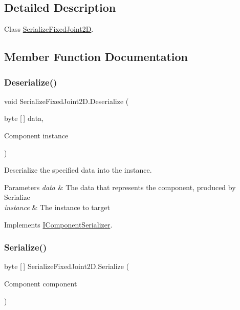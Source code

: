 \subsection{Detailed Description}
Class \hyperlink{class_serialize_fixed_joint2_d}{Serialize\+Fixed\+Joint2D}. 



\subsection{Member Function Documentation}
\mbox{\label{class_serialize_fixed_joint2_d_aa2cc872282e6bb7c209ac406fb0b8335}} 
\subsubsection{\texorpdfstring{Deserialize()}{Deserialize()}}
{\footnotesize\ttfamily void Serialize\+Fixed\+Joint2\+D.\+Deserialize (\begin{DoxyParamCaption}\item[{byte \mbox{[}$\,$\mbox{]}}]{data,  }\item[{Component}]{instance }\end{DoxyParamCaption})\hspace{0.3cm}{\ttfamily [inline]}}



Deserialize the specified data into the instance. 


\begin{DoxyParams}{Parameters}
{\em data} & The data that represents the component, produced by Serialize\\
\hline
{\em instance} & The instance to target\\
\hline
\end{DoxyParams}


Implements \hyperlink{interface_i_component_serializer_a4cc366a5c78b33d47a90c209d8fed883}{I\+Component\+Serializer}.

\mbox{\label{class_serialize_fixed_joint2_d_a9eb05bc525fe5cbf55dd5e917e2f36f2}} 
\subsubsection{\texorpdfstring{Serialize()}{Serialize()}}
{\footnotesize\ttfamily byte \mbox{[}$\,$\mbox{]} Serialize\+Fixed\+Joint2\+D.\+Serialize (\begin{DoxyParamCaption}\item[{Component}]{component }\end{DoxyParamCaption})\hspace{0.3cm}{\ttfamily [inline]}}



